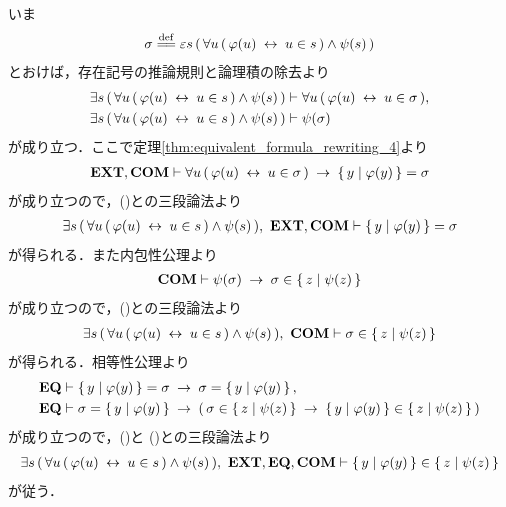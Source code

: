 	\begin{sketch}
		いま
		\begin{align}
			\sigma \defeq \varepsilon s\, (\, \forall u\, (\, \varphi(u) \lrarrow u \in s\, ) \wedge \psi(s)\, )
		\end{align}
		とおけば，存在記号の推論規則と論理積の除去より
		\begin{align}
			\exists s\, (\, \forall u\, (\, \varphi(u) \hspace{0.25em}\leftrightarrow\hspace{0.25em} u \in s\, ) \wedge \psi(s)\, )
			&\vdash \forall u\, (\, \varphi(u) \hspace{0.25em}\leftrightarrow\hspace{0.25em} u \in \sigma\, ), 
			\label{fom:equivalent_formula_rewriting_12_1} \\
			\exists s\, (\, \forall u\, (\, \varphi(u) \hspace{0.25em}\leftrightarrow\hspace{0.25em} u \in s\, ) \wedge \psi(s)\, )
			&\vdash \psi(\sigma)
			\label{fom:equivalent_formula_rewriting_12_2}
		\end{align}
		が成り立つ．ここで定理\ref{thm:equivalent_formula_rewriting_4}より
		\begin{align}
			\mbox{{\bf EXT}},\mbox{\bf COM} \vdash \forall u\, (\, \varphi(u) \hspace{0.25em}\leftrightarrow\hspace{0.25em} u \in \sigma\, )
			\hspace{0.25em}\rightarrow\hspace{0.25em} \left\{\, y \mid \varphi(y)\, \right\} = \sigma
		\end{align}
		が成り立つので，()との三段論法より
		\begin{align}
			\exists s\, (\, \forall u\, (\, \varphi(u) \hspace{0.25em}\leftrightarrow\hspace{0.25em} u \in s\, ) \wedge \psi(s)\, ),\ \mbox{{\bf EXT}},\mbox{\bf COM} \vdash \left\{\, y \mid \varphi(y)\, \right\} = \sigma
			\label{fom:equivalent_formula_rewriting_12_3}
		\end{align}
		が得られる．また内包性公理より
		\begin{align}
			\mbox{\bf COM} \vdash \psi(\sigma) \hspace{0.25em}\rightarrow\hspace{0.25em} \sigma \in \left\{\, z \mid \psi(z)\, \right\}
		\end{align}
		が成り立つので，()との三段論法より
		\begin{align}
			\exists s\, (\, \forall u\, (\, \varphi(u) \hspace{0.25em}\leftrightarrow\hspace{0.25em} u \in s\, ) \wedge \psi(s)\, ),\ \mbox{\bf COM} \vdash \sigma \in \left\{\, z \mid \psi(z)\, \right\}
			\label{fom:equivalent_formula_rewriting_12_4}
		\end{align}
		が得られる．相等性公理より
		\begin{align}
			\mbox{{\bf EQ}} &\vdash \left\{\, y \mid \varphi(y)\, \right\} = \sigma \hspace{0.25em}\rightarrow\hspace{0.25em} \sigma = \left\{\, y \mid \varphi(y)\, \right\}, \\
			\mbox{{\bf EQ}} &\vdash \sigma = \left\{\, y \mid \varphi(y)\, \right\} \hspace{0.25em}\rightarrow\hspace{0.25em}
			(\, \sigma \in \left\{\, z \mid \psi(z)\, \right\} \hspace{0.25em}\rightarrow\hspace{0.25em} \left\{\, y \mid \varphi(y)\, \right\} \in \left\{\, z \mid \psi(z)\, \right\}\, )
		\end{align}
		が成り立つので，()と
		()との三段論法より
		\begin{align}
			\exists s\, (\, \forall u\, (\, \varphi(u) \hspace{0.25em}\leftrightarrow\hspace{0.25em} u \in s\, ) \wedge \psi(s)\, ),\ \mbox{{\bf EXT}},\mbox{{\bf EQ}},\mbox{\bf COM} \vdash \left\{\, y \mid \varphi(y)\, \right\} \in \left\{\, z \mid \psi(z)\, \right\}
		\end{align}
		が従う．
		\QED
	\end{sketch}